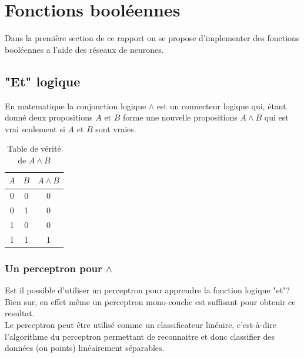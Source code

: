 \documentclass[twoside,openright,a4paper,11pt,french]{article}
\begin{document}
\pagestyle{plain}
\setlength{\parindent}{0pt}



\parskip=0pt
\tableofcontents


\vspace{5cm}


\section{Fonctions booléennes}

Dans la première section de ce rapport on se propose
d'implementer des fonctions booléennes a l'aide des réseaux
de neurones. 

\subsection{"Et" logique}

En matematique la conjonction logique $\land$ est un
connecteur logique qui, étant donné deux propositions $A$ et $B$
forme une nouvelle propositions $A \land B$ qui est vrai seulement
si $A$ et $B$ sont vraies.

\begin{table}[h]
  \centering
  \begin{tabular}{| c | c | c |}
    \hline
    \textbf{$A$} & \textbf{$B$} & \textbf{$A \land B$}\\
    \hline
    0 & 0  & 0 \\
    \hline
    0 & 1  & 0 \\
    \hline
    1 & 0  & 0 \\
    \hline
    1 & 1  & 1 \\
    \hline
  \end{tabular}
  \caption{Table de vérité de $A \land B$}
  \label{tab:et}
\end{table}




\subsubsection{Un perceptron pour $\land$} 

Est il possible d'utiliser un perceptron pour apprendre la fonction logique
"et"? Bien sur, en effet même un perceptron mono-couche est suffisant pour
obtenir ce resultat.\\

Le perceptron peut être utilisé comme un classificateur linéaire, c'est-à-dire l'algorithme du
perceptron permettant de reconnaitre et donc classifier des données (ou points)
linéairement séparables.\\
\end{document}
